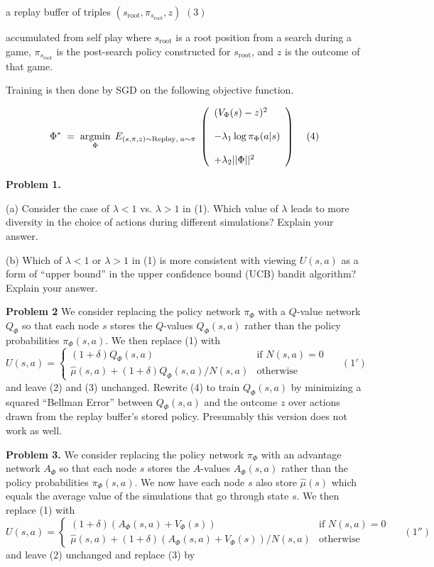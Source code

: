 \documentclass{article}
\begin{document}
\medskip
\centerline{a replay buffer of triples $(s_{\mathrm{root}},\pi_{s_{\mathrm{root}}},z)$ \hspace{2em}$(3)$}

\medskip
accumulated from self play where $s_{\mathrm{root}}$ is a root position from a search during a game,
$\pi_{s_{\mathrm{root}}}$ is the post-search policy constructed for $s_{\mathrm{root}}$, and $z$ is the outcome of that game.

\medskip
Training is then done by SGD on the following objective function.

$$\Phi^*\; = \;\operatorname*{argmin}_\Phi \;E_{(s,\pi,z) \sim \mathrm{Replay},\;a \sim \pi}\;\left(\begin{array}{l} (V_\Phi(s) - z)^2 \\ \\ - \lambda_1\log \pi_\Phi(a|s) \\ \\ + \lambda_2||\Phi||^2\end{array}\right)\;\;\;\;(4)$$

\bigskip
{\bf Problem 1.}
    
\medskip
(a) Consider the case of $\lambda < 1$ vs. $\lambda > 1$ in (1).  Which value of $\lambda$ leads to more diversity in the choice of actions during different simulations?  Explain your answer.

\medskip
(b) Which of $\lambda < 1$ or $\lambda > 1$ in (1) is more consistent with viewing $U(s,a)$ as a form of ``upper bound'' in the upper confidence bound (UCB) bandit algorithm?  Explain your answer.

\bigskip
{\bf Problem 2}
We consider replacing the policy network $\pi_\Phi$ with a $Q$-value network $Q_\Phi$ so that each node $s$ stores the $Q$-values $Q_\Phi(s,a)$ rather than
the policy probabilities $\pi_\Phi(s,a)$.  We then replace (1) with
$$U(s,a) =  \left\{\begin{array}{ll}(1 + \delta) Q_\Phi(s,a) &\mbox{if $N(s,a) = 0$} \\ \hat{\mu}(s,a) + (1 + \delta) Q_\Phi(s,a)/N(s,a) & \mbox{otherwise} \end{array}\right.\;\;\;\;\;(1')$$
and leave (2) and (3) unchanged.  Rewrite (4) to train $Q_\Phi(s,a)$ by minimizing a squared ``Bellman Error'' between $Q_\Phi(s,a)$ and the outcome $z$ over actions drawn from the replay buffer's stored policy.
Presumably this version does not work as well.

\bigskip
{\bf Problem 3.}
We consider replacing the policy network $\pi_\Phi$ with an advantage network $A_\Phi$ so that each node $s$ stores the $A$-values $A_\Phi(s,a)$ rather than
the policy probabilities $\pi_\Phi(s,a)$.  We now have each node $s$ also store $\hat{\mu}(s)$ which equals the average value of the simulations that go through state $s$.
We then replace (1) with
$$U(s,a) =  \left\{\begin{array}{ll}(1+\delta)(A_\Phi(s,a) + V_\Phi(s)) &\mbox{if $N(s,a) = 0$} \\ \hat{\mu}(s,a) + (1+\delta)(A_\Phi(s,a) + V_\Phi(s))/N(s,a) & \mbox{otherwise} \end{array}\right.\;\;\;\;\;(1'')$$
and leave (2) unchanged and replace (3) by
\end{document}
